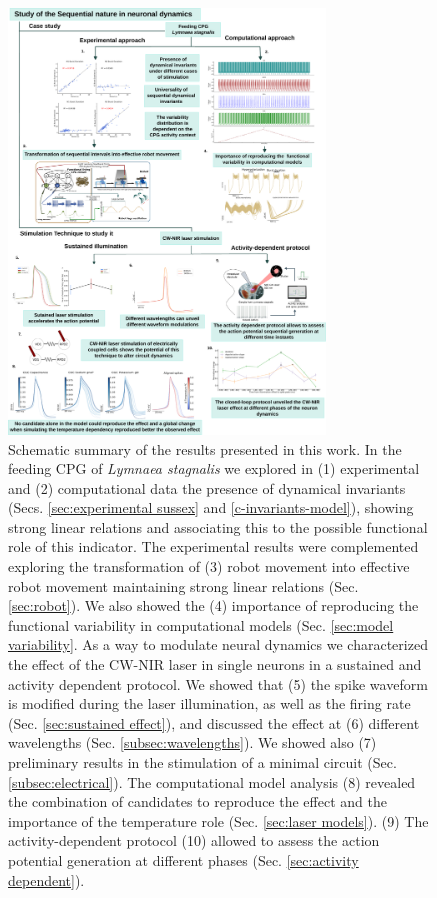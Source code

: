 \begin{figure}[htb!]
	\centering
	\includegraphics[width=0.75\textwidth]{img/panel_discussion_vertical_figures.pdf}
	\caption{Schematic summary of the results presented in this work. In the feeding CPG of \textit{Lymnaea stagnalis} we explored in (1) experimental and (2) computational data the presence of dynamical invariants (Secs. \ref{sec:experimental sussex} and \ref{c-invariants-model}), showing strong linear relations and associating this to the possible functional role of this indicator. The experimental results were complemented exploring the transformation of (3) robot movement into effective robot movement maintaining strong linear relations (Sec. \ref{sec:robot}). We also showed the (4) importance of reproducing the functional variability in computational models (Sec. \ref{sec:model variability}. As a way to modulate neural dynamics we characterized the effect of the CW-NIR laser in single neurons in a sustained and activity dependent protocol. We showed that (5) the spike waveform is modified during the laser illumination, as well as the firing rate (Sec. \ref{sec:sustained effect}), and discussed the effect at (6) different wavelengths (Sec. \ref{subsec:wavelengths}). We showed also (7) preliminary results in the stimulation of a minimal circuit (Sec. \ref{subsec:electrical}). The computational model analysis (8) revealed the combination of candidates to reproduce the effect and the importance of the temperature role (Sec. \ref{sec:laser models}). (9) The activity-dependent protocol (10) allowed to assess the action potential generation at different phases (Sec. \ref{sec:activity dependent}).}
	\label{fig:discussion summary}
\end{figure}

